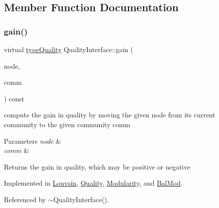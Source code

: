 \subsection{Member Function Documentation}
\mbox{\label{classQualityInterface_ab6a2e15d118c3945243abb96c7cc0360}} 
\subsubsection{\texorpdfstring{gain()}{gain()}}
{\footnotesize\ttfamily virtual \hyperlink{qualityInterface_8h_a15a3ec6041e6e02d00d2eff22c20fd94}{type\+Quality} Quality\+Interface\+::gain (\begin{DoxyParamCaption}\item[{const \hyperlink{edge_8h_a5fbd20c46956d479cb10afc9855223f6}{type\+Vertex} \&}]{node,  }\item[{const \hyperlink{graphUndirectedGroupable_8h_a914da95c9ea7f14f4b7f875c36818556}{type\+Community} \&}]{comm }\end{DoxyParamCaption}) const\hspace{0.3cm}{\ttfamily [pure virtual]}}

compute the gain in quality by moving the given node from its current community to the given community comm 
\begin{DoxyParams}{Parameters}
{\em node} & \\
\hline
{\em comm} & \\
\hline
\end{DoxyParams}
\begin{DoxyReturn}{Returns}
the gain in quality, which may be positive or negative 
\end{DoxyReturn}


Implemented in \hyperlink{classLouvain_ac95d6e53e46b6321aa02b80f0c69bd13}{Louvain}, \hyperlink{classQuality_a1754dc190ca3204035d873c4d4b580cd}{Quality}, \hyperlink{classModularity_afb4e750456a0138c2880e679df6d431d}{Modularity}, and \hyperlink{classBalMod_a5e65ffa1b97d2455a552ed98cb003bcc}{Bal\+Mod}.



Referenced by $\sim$\+Quality\+Interface().

\mbox{\label{classQualityInterface_a1c40b3e5e51d8ed2a4390b3cb0164f0a}} 
